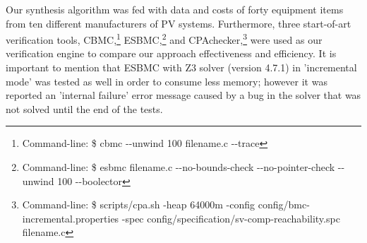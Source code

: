 \documentclass[runningheads]{llncs}
\begin{document}
Our synthesis algorithm was fed with data and costs of forty equipment items from ten different manufacturers of PV systems. Furthermore, three start-of-art verification tools, CBMC,\footnote{Command-line: \$ cbmc -\phantom{}-unwind 100 filename.c -\phantom{}-trace} ESBMC,\footnote{Command-line: \$ esbmc filename.c -\phantom{}-no-bounds-check -\phantom{}-no-pointer-check -\phantom{}-unwind 100 -\phantom{}-boolector} %
and CPAchecker,\footnote{Command-line: \$ scripts/cpa.sh -heap 64000m -config config/bmc-incremental.properties -spec config/specification/sv-comp-reachability.spc filename.c} were used as our verification engine to compare our approach effectiveness and efficiency. It is important to mention that ESBMC with Z3 solver (version 4.7.1) in 'incremental mode' was tested as well in order to consume less memory; however it was reported an 'internal failure' error message caused by a bug in the solver that was not solved until the end of the tests.
\end{document}
